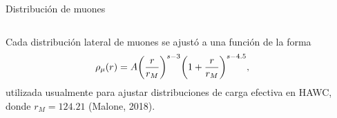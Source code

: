 \documentclass[10pt,xcolor=table]{beamer}
\begin{document}
\begin{frame}{Distribuci\'on de muones}
	\begin{columns}
		\begin{column}{0.5\textwidth}
		Cada distribuci\'on lateral de muones se ajust\'o a una funci\'on de la forma
				\begin{align*} 
				\rho_{\mu}(r) = A \qty(\frac{r}{r_M})^{s-3}\qty(1+\frac{r}{r_M})^{s-4.5},
				\end{align*}	
			utilizada usualmente para ajustar distribuciones de carga efectiva en HAWC, donde $r_M = 124.21$ (Malone, 2018).
		
		\end{column}
	
		\begin{column}{0.5\textwidth}
		\begin{overlayarea}{\textwidth}{0.8\textheight}
\end{overlayarea}
\end{column}
\end{columns}
\end{frame}
\end{document}
